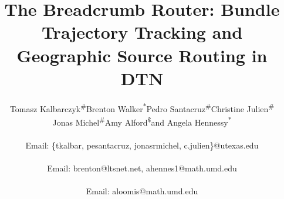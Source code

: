 \title{The Breadcrumb Router: Bundle Trajectory Tracking and Geographic Source Routing in DTN}

\author{
\alignauthor
Tomasz Kalbarczyk\textsuperscript{\#}\quad Brenton
Walker\textsuperscript{*}\quad Pedro
Santacruz\textsuperscript{\#}\quad Christine
Julien\textsuperscript{\#}\quad\\
Jonas  Michel\textsuperscript{\#}\quad Amy
Alford\textsuperscript{\$}\quad and Angela
Hennessy\textsuperscript{*}\quad\\  
\\
Email: \{tkalbar, pesantacruz, jonasrmichel, c.julien\}@utexas.edu\\
\\
Email: brenton@ltsnet.net, ahennes1@math.umd.edu\\
\\
Email: aloomis@math.umd.edu
}



\maketitle
